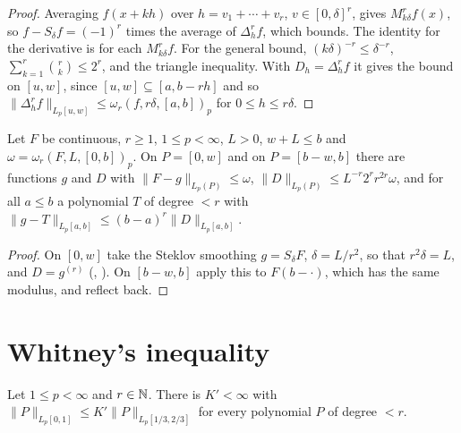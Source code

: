 \begin{proof}
\leanok
Averaging $f(x + k h)$ over $h = v_1 + \cdots + v_r$, $v \in [0, \delta]^r$, gives
$M_{k\delta}^r f(x)$, so $f - S_\delta f = (-1)^r$ times the average of $\Delta_h^r f$, which
 bounds. The identity for the derivative is  for
each $M_{k\delta}^r f$. For the general bound, $(k\delta)^{-r} \leq \delta^{-r}$,
$\sum_{k=1}^r \binom{r}{k} \leq 2^r$, and the triangle inequality. With
$D_h = \Delta_h^r f$ it gives the bound on $[u, w]$, since $[u, w] \subseteq [a, b - rh]$ and so
$\|\Delta_h^r f\|_{L_p[u, w]} \leq \omega_r(f, r\delta, [a, b])_p$ for $0 \leq h \leq r\delta$.
\end{proof}

\begin{lemma}
\label{lem:two-sided-smoothing}
\leanok
{}
Let $F$ be continuous, $r \geq 1$, $1 \leq p < \infty$, $L > 0$, $w + L \leq b$ and
$\omega = \omega_r(F, L, [0, b])_p$. On $P = [0, w]$ and on $P = [b - w, b]$ there are functions
$g$ and $D$ with $\|F - g\|_{L_p(P)} \leq \omega$, $\|D\|_{L_p(P)} \leq L^{-r} 2^r r^{2r} \omega$, and
for all $a \leq b$ a polynomial $T$ of degree $< r$ with
$\|g - T\|_{L_p[a,b]} \leq (b - a)^r \|D\|_{L_p[a,b]}$.
\end{lemma}

\begin{proof}
\leanok
On $[0, w]$ take the Steklov smoothing $g = S_\delta F$, $\delta = L/r^2$, so that
$r^2 \delta = L$, and $D = g^{(r)}$ (, ). On
$[b - w, b]$ apply this to $F(b - \cdot)$, which has the same modulus, and reflect back.
\end{proof}

\section{Whitney's inequality}

\begin{lemma}
\label{lem:middle-third}
\leanok
{}
Let $1 \leq p < \infty$ and $r \in \mathbb{N}$. There is $K' < \infty$ with
$\|P\|_{L_p[0,1]} \leq K' \|P\|_{L_p[1/3, 2/3]}$ for every polynomial $P$ of degree $< r$.
\end{lemma}


